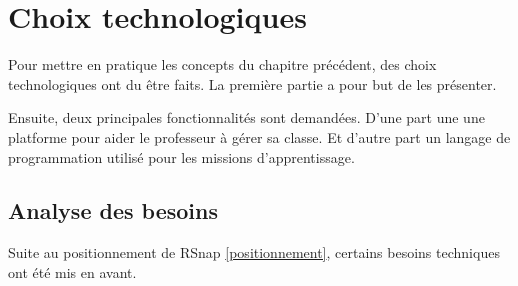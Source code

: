 \section{Choix technologiques} %
Pour mettre en pratique les concepts du chapitre précédent, des choix technologiques ont du être faits. La première partie a pour but de les présenter.

Ensuite, deux principales fonctionnalités sont demandées. %
D'une part une une platforme pour aider le professeur à gérer sa classe. Et d'autre part un langage de programmation utilisé pour les missions d'apprentissage. 




\subsection{Analyse des besoins} %
Suite au positionnement de RSnap \ref{positionnement}, certains besoins techniques ont été mis en avant.



